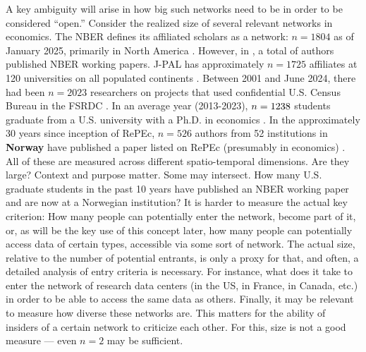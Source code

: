 \documentclass{Revue-economique}
\newcommand{\citep}{\parencite}
\begin{document}
\begin{Article} [%
	Titre={Reproducibility and Open Science in Economics},
	Auteur={Lars Vilhuber\thanks{Cornell University, lars.vilhuber@cornell.edu}}]
\begin{refsection}[Main]
A key ambiguity will arise in how big such networks need to be in order to be considered ``open.'' Consider the realized size of several relevant networks in economics. The \ac{NBER} defines its affiliated scholars as a network: $n=1804$ as of January 2025, primarily in North America \citep{national_bureau_of_economic_research_affiliated_2025}. However, in \nberyear{}, a total of \nberauthorsunique{} authors published \nberpapers{} NBER working papers. J-PAL has approximately $n=1725$ affiliates at 120 universities on all populated continents \citep{abdul_latif_jameel_poverty_action_lab_affiliated_2025}. Between 2001 and June 2024, there had been $n=2023$ researchers on projects that used confidential U.S. Census Bureau in the \ac{FSRDC} \citep{us_census_bureau_uscensusbureaufsrdc-external-census-projects_2024}. In an average year (2013-2023), $n=1238{}$ students graduate from a U.S. university with a Ph.D. in economics \citep[Table 1-5]{national_science_foundation_doctorate_2024}. In the approximately 30 years since inception of \ac{RePEc}, $n=526$ authors from 52 institutions in \textbf{Norway} have published a paper listed on \ac{RePEc} (presumably in economics) \citep{ideasrepec_within_2025}. All of these are measured across different spatio-temporal dimensions. Are they large? Context and purpose matter. Some may intersect. How many U.S. graduate students in the past 10 years have published an NBER working paper and are now at a Norwegian institution? %
It is harder to measure the actual key criterion: How many people can potentially enter the network, become part of it, or, as will be the key use of this concept later, how many people can potentially access data of certain types, accessible via some sort of network. The actual size, relative to the number of potential entrants, is only a proxy for that, and often, a detailed analysis of entry criteria is necessary. For instance, what does it take to enter the network of research data centers (in the US, in France, in Canada, etc.) in order to be able to access the same data as others.  Finally, it may be relevant to measure how diverse these networks are. This matters for the ability of insiders of a certain network to criticize each other. For this, size is not a good measure --- even $n=2$ may be sufficient. 


\end{refsection}
\end{Article}
\end{document}
